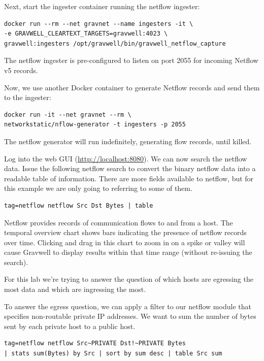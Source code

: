 Next, start the ingester container running the netflow ingester:

\begin{Verbatim}[breaklines=true]
docker run --rm --net gravnet --name ingesters -it \
-e GRAVWELL_CLEARTEXT_TARGETS=gravwell:4023 \
gravwell:ingesters /opt/gravwell/bin/gravwell_netflow_capture
\end{Verbatim}

The netflow ingester is pre-configured to listen on port 2055 for
incoming Netflow v5 records.

Now, we use another Docker container to generate Netflow records and
send them to the ingester:

\begin{Verbatim}[breaklines=true]
docker run -it --net gravnet --rm \
networkstatic/nflow-generator -t ingesters -p 2055
\end{Verbatim}

The netflow generator will run indefinitely, generating flow records,
until killed.

Log into the web GUI (\href{http://localhost:8080}{http://localhost:8080}).
We can now search the netflow data. Issue the following netflow search to convert the binary netflow data
into a readable table of information. There are more fields available to
netflow, but for this example we are only going to referring to some of
them.

\begin{Verbatim}[breaklines=true]
tag=netflow netflow Src Dst Bytes | table
\end{Verbatim}

Netflow provides records of communication flows to and from a host. The
temporal overview chart shows bars indicating the presence of netflow
records over time. Clicking and drag in this chart to zoom in on a spike or
valley will cause Gravwell to display results within that time
range (without re-issuing the search).

For this lab we're trying to answer the question of which hosts are
egressing the most data and which are ingressing the most.

To answer the egress question, we can apply a filter to our netflow
module that specifies non-routable private IP addresses. We want to sum
the number of bytes sent by each private host to a public host.

\begin{Verbatim}[breaklines=true]
tag=netflow netflow Src~PRIVATE Dst!~PRIVATE Bytes
| stats sum(Bytes) by Src | sort by sum desc | table Src sum
\end{Verbatim}

